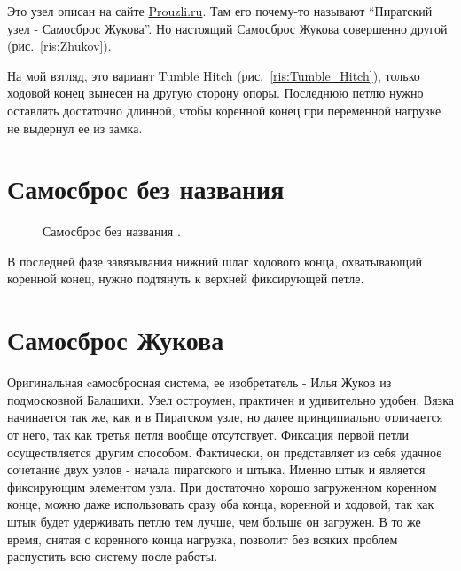 \documentclass{artikel1}
\newcounter{SamosbrosNoName}\setcounter{SamosbrosNoName}{0}
\begin{document}
\addtocounter{SamosbrosNoName}{1}

Это узел описан на сайте \href{http://prouzli.ru}{Prouzli.ru}. Там его почему-то называют “Пиратский узел - Самосброс Жукова”. Но настоящий Самосброс Жукова совершенно другой (рис.~\ref{ris:Zhukov}).

На мой взгляд, это вариант Tumble Hitch (рис.~\ref{ris:Tumble_Hitch}), только ходовой конец вынесен на другую сторону опоры. Последнюю петлю нужно оставлять достаточно длинной, чтобы коренной конец при переменной нагрузке не выдернул ее из замка.

\section{Самосброс без названия }

\begin{figure}[H]\centering
	\subfloat[Завязывание]{\label{ris:Piratsky_4_1}
	\tcbox[enhanced jigsaw,colframe=black,opacityframe=0.5,opacityback=0.5,height=6cm]
		{\centering
			}
		}
\hfill
	\subfloat[Затягивание]{\label{ris:Piratsky_4_2}
	\tcbox[enhanced jigsaw,colframe=black,opacityframe=0.5,opacityback=0.5,height=6cm]
		{\centering
			}
		}
\hfill
	\subfloat[Результат]{\label{ris:Piratsky_4_3}
	\tcbox[enhanced jigsaw,colframe=black,opacityframe=0.5,opacityback=0.5]
		{\centering
			}
		}
	\caption{Самосброс без названия .}\label{ris:Piratsky_4}
\end{figure}

В последней фазе завязывания нижний шлаг ходового конца, охватывающий коренной конец, нужно подтянуть к верхней фиксирующей петле.

\section{Самосброс Жукова}

Оригинальная cамосбросная система, ее изобретатель - Илья Жуков из подмосковной Балашихи. Узел остроумен, практичен и удивительно удобен. Вязка начинается так же, как и в Пиратском узле, но далее принципиально отличается от него, так как третья петля вообще отсутствует. Фиксация первой петли осуществляется другим способом. Фактически, он представляет из себя удачное сочетание двух узлов - начала пиратского и штыка. Именно штык и является фиксирующим элементом узла. При достаточно хорошо загруженном коренном конце, можно даже использовать сразу оба конца, коренной и ходовой, так как штык будет удерживать петлю тем лучше, чем больше он загружен. В то же время, снятая с коренного конца нагрузка, позволит без всяких проблем распустить всю систему после работы.
\end{document}
